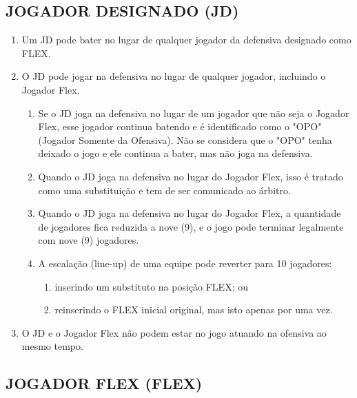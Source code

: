 \subsection{JOGADOR DESIGNADO (JD)}
\begin{enumerate}[label=(\alph*)]
	\item\begin{mdframed}[hidealllines=true,backgroundcolor=blue!20]
		Um JD pode bater no lugar de qualquer jogador da defensiva designado como FLEX.
	\end{mdframed}
	\item O JD pode jogar na defensiva no lugar de qualquer jogador, incluindo o Jogador Flex.
	\begin{enumerate}[label=\roman*.]
		\item  Se o JD joga na defensiva no lugar de um jogador que não seja o Jogador Flex, esse jogador continua batendo e é identificado como o "OPO" (Jogador Somente da Ofensiva). Não se considera que o "OPO" tenha deixado o jogo e ele continua a bater, mas não joga na defensiva.
		\item Quando o JD joga na defensiva no lugar do Jogador Flex, isso é tratado como uma substituição e tem de ser comunicado ao árbitro.
		\item Quando o JD joga na defensiva no lugar do Jogador Flex, a quantidade de jogadores fica reduzida a nove (9), e o jogo pode terminar legalmente com nove (9) jogadores.

		\item
		\begin{mdframed}[hidealllines=true,backgroundcolor=blue!20]
			A escalação (\gls{line-up}) de uma equipe pode reverter para 10 jogadores:
			\begin{enumerate}[label=\arabic*)]
				\item  inserindo um substituto na posição FLEX; ou
				\item reinserindo o FLEX inicial original, mas isto apenas por uma vez.
			\end{enumerate}
		\end{mdframed}
	\end{enumerate}
	\item O JD e o Jogador Flex não podem estar no jogo atuando na ofensiva ao mesmo tempo.
\end{enumerate}

\subsection{JOGADOR FLEX (FLEX)}

